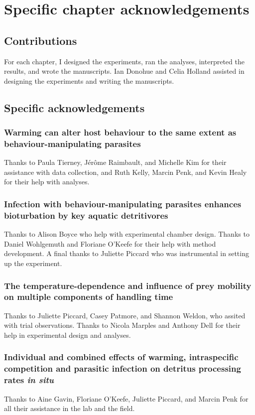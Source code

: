 \chapter*{Specific chapter acknowledgements}

\section*{Contributions}
For each chapter, I designed the experiments, ran the analyses, interpreted the results, and wrote the manuscripts. Ian Donohue and Celia Holland assisted in designing the experiments and writing the manuscripts.

\section*{Specific acknowledgements}

\subsection*{Warming can alter host behaviour to the same extent as behaviour-manipulating parasites}
Thanks to Paula Tierney, Jérôme Raimbault, and Michelle Kim for their assistance with data collection, and Ruth Kelly, Marcin Penk, and Kevin Healy for their help with analyses. 

\subsection*{Infection with behaviour-manipulating parasites enhances bioturbation by key aquatic detritivores}
Thanks to Alison Boyce who help with experimental chamber design. Thanks to Daniel Wohlgemuth and Floriane O'Keefe for their help with method development. A final thanks to Juliette Piccard who was instrumental in setting up the experiment.

\subsection*{The temperature-dependence and influence of prey mobility on multiple components of handling time}
Thanks to Juliette Piccard, Casey Patmore, and Shannon Weldon, who assited with trial observations. Thanks to Nicola Marples and Anthony Dell for their help in experimental design and analyses.

\subsection*{Individual and combined effects of warming, intraspecific competition and parasitic infection on detritus processing rates \emph{in situ}}
Thanks to Aine Gavin, Floriane O'Keefe, Juliette Piccard, and Marcin Penk for all their assistance in the lab and the field.
